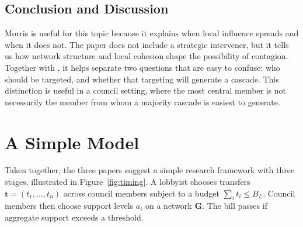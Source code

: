 \documentclass[11pt,letterpaper]{article}
\begin{document}
\subsection{Conclusion and Discussion}

Morris is useful for this topic because it explains when local influence spreads and when it does not. The paper does not include a strategic intervener, but it tells us how network structure and local cohesion shape the possibility of contagion. Together with \citet{galeotti2020}, it helps separate two questions that are easy to confuse: who should be targeted, and whether that targeting will generate a cascade. This distinction is useful in a council setting, where the most central member is not necessarily the member from whom a majority cascade is easiest to generate.

\section{A Simple Model}
\label{sec:synth}

Taken together, the three papers suggest a simple research framework with three stages, illustrated in Figure~\ref{fig:timing}. A lobbyist chooses transfers $\mathbf{t} = (t_1,\ldots,t_n)$ across council members subject to a budget $\sum_i t_i \leq B_L$. Council members then choose support levels $a_i$ on a network $\mathbf{G}$. The bill passes if aggregate support exceeds a threshold.
\end{document}
